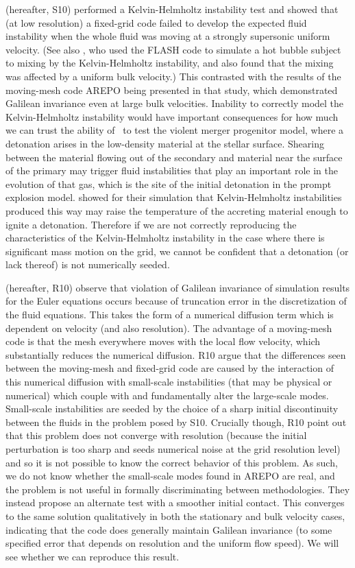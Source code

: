 \documentclass[12pt]{article}
\begin{document}
\citet{arepo} (hereafter, S10) performed a Kelvin-Helmholtz instability test and showed
that (at low resolution) a fixed-grid code failed to develop the
expected fluid instability when the whole fluid was moving at a
strongly supersonic uniform velocity. (See also \citet{wadsley:2008}, 
who used the FLASH code to simulate a hot bubble subject to mixing 
by the Kelvin-Helmholtz instability, and also found that the mixing was affected by a 
uniform bulk velocity.) This contrasted with the results
of the moving-mesh code AREPO being presented in that study, which
demonstrated Galilean invariance even at large bulk velocities. 
Inability to correctly model the Kelvin-Helmholtz instability would 
have important consequences for how much we can trust the ability of 
\castro\ to test the violent merger progenitor model, where a detonation 
arises in the low-density material at the stellar surface. Shearing between 
the material flowing out of the secondary and material near the 
surface of the primary may trigger fluid
instabilities that play an important role in the evolution of that
gas, which is the site of the initial detonation in the prompt
explosion model. \citet{guillochon:2010} showed for their simulation
that Kelvin-Helmholtz instabilities produced this way may raise the
temperature of the accreting material enough to ignite a
detonation. Therefore if we are not correctly reproducing the
characteristics of the Kelvin-Helmholtz instability in the case where
there is significant mass motion on the grid, we cannot be confident
that a detonation (or lack thereof) is not numerically
seeded. 

\citet{robertson:2010} (hereafter, R10) observe that violation of Galilean
invariance of simulation results for the Euler equations occurs 
because of truncation error in the discretization of the fluid
equations. This takes the form of a numerical diffusion term which is
dependent on velocity (and also resolution). The advantage of a
moving-mesh code is that the mesh everywhere moves with the local flow
velocity, which substantially reduces the numerical
diffusion. R10 argue that the differences seen
between the moving-mesh and fixed-grid code are caused by the
interaction of this numerical diffusion with small-scale instabilities
(that may be physical or numerical) which couple with and
fundamentally alter the large-scale modes. Small-scale instabilities
are seeded by the choice of a sharp initial discontinuity between the 
fluids in the problem posed by S10. Crucially though,
R10 point out that this problem does not
converge with resolution (because the initial perturbation is too sharp 
and seeds numerical noise at the grid resolution level) 
and so it is not possible to know the correct
behavior of this problem. As such, we do not know whether the
small-scale modes found in AREPO are real, and the problem is not
useful in formally discriminating between methodologies. They instead
propose an alternate test with a smoother initial contact. This
converges to the same solution qualitatively in both the stationary
and bulk velocity cases, indicating that the code does generally
maintain Galilean invariance (to some specified error that depends on
resolution and the uniform flow speed).  We will see whether we can
reproduce this result.
\end{document}
